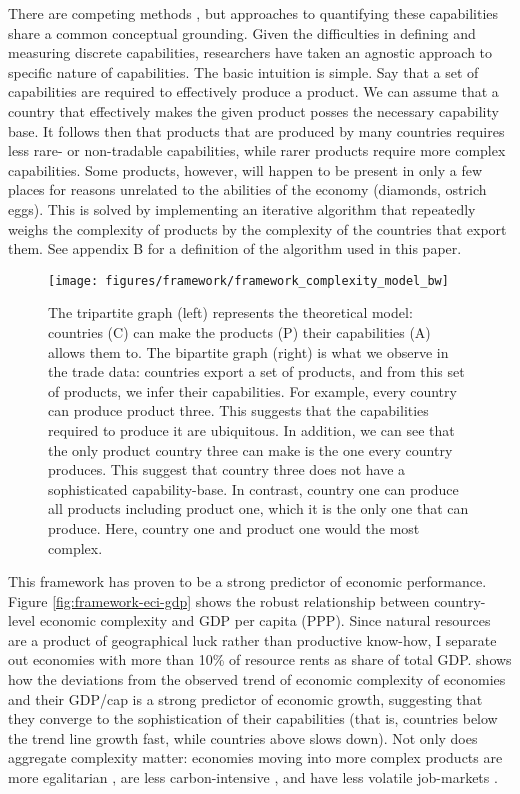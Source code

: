 \documentclass[11pt]{article}
\begin{document}
There are competing methods \citep{tacchella_new_2012,hidalgo_building_2009,inoua_simple_2016}, but approaches to quantifying these capabilities share a common conceptual grounding. Given the difficulties in defining and measuring discrete capabilities, researchers have taken an agnostic approach to specific nature of capabilities. The basic intuition is simple. Say that a set of capabilities are required to effectively produce a product. We can assume that a country that effectively makes the given product posses the necessary capability base. It follows then that products that are produced by many countries requires less rare- or non-tradable capabilities, while rarer products require more complex capabilities. Some products, however, will happen to be present in only a few places for reasons unrelated to the abilities of the economy (diamonds, ostrich eggs). This is solved by implementing an iterative algorithm that repeatedly weighs the complexity of products by the complexity of the countries that export them. See appendix B for a definition of the algorithm used in this paper.


\begin{figure}[htpb]
  \centering
  \texttt{[image: figures/framework/framework\_complexity\_model\_bw]}
  \caption[The conceptual model behind Economic Complexity]{The tripartite graph (left) represents the theoretical model: countries (C) can make the products (P) their capabilities (A) allows them to. The bipartite graph (right) is what we observe in the trade data: countries export a set of products, and from this set of products, we infer their capabilities. For example, every country can produce product three. This suggests that the capabilities required to produce it are ubiquitous. In addition, we can see that the only product country three can make is the one every country produces. This suggest that country three does not have a sophisticated capability-base. In contrast, country one can produce all products including product one, which it is the only one that can produce. Here, country one and product one would the most complex.}
	\label{fig:complexity-model}
\end{figure}

This framework has proven to be a strong predictor of economic performance. Figure \ref{fig:framework-eci-gdp} shows the robust relationship between country-level economic complexity and GDP per capita (PPP). Since natural resources are a product of geographical luck rather than productive know-how, I separate out economies with more than 10\% of resource rents as share of total GDP. \cite{hausmann_atlas_2013} shows how the deviations from the observed trend of economic complexity of economies and their GDP/cap is a strong predictor of economic growth, suggesting that they converge to the sophistication of their capabilities (that is, countries below the trend line growth fast, while countries above slows down). Not only does aggregate complexity matter: economies moving into more complex products are more egalitarian \citep{hartmann_linking_2017-1}, are less carbon-intensive \citep{can_impact_2017}, and have less volatile job-markets \citep{adam_economic_2019}.
\end{document}
